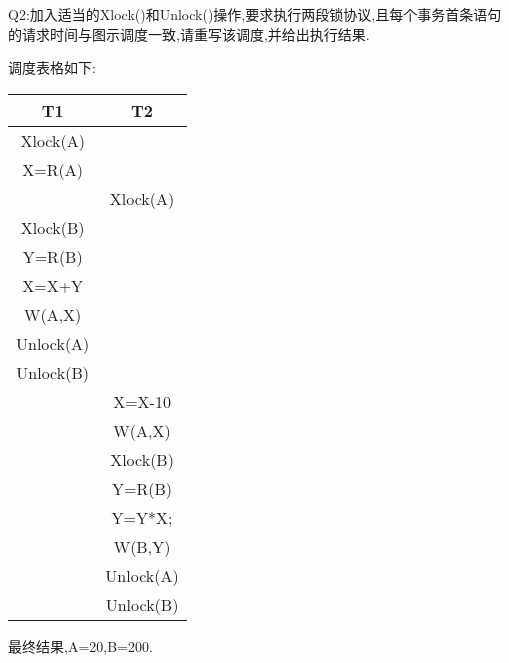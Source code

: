 Q2:加入适当的Xlock()和Unlock()操作,要求执行两段锁协议,且每个事务首条语句的请求时间与图示调度一致,请重写该调度,并给出执行结果.
\par 调度表格如下:
\begin{table}[H] 
    \centering
    \begin{tabular}{cc} %
        \toprule %
        T1 & T2  \\
        \midrule %
        Xlock(A) &  \\
        X=R(A) &  \\
        & Xlock(A) \\
        Xlock(B) & \\
        Y=R(B) & \\
        X=X+Y & \\
        W(A,X) & \\
        Unlock(A) & \\
        Unlock(B) & \\
        & X=X-10 \\
        & W(A,X) \\
        & Xlock(B) \\
        & Y=R(B) \\
        & Y=Y*X;\\
        & W(B,Y) \\
        & Unlock(A) \\
        & Unlock(B) \\
        \bottomrule %
    \end{tabular}
\end{table}
最终结果,A=20,B=200.